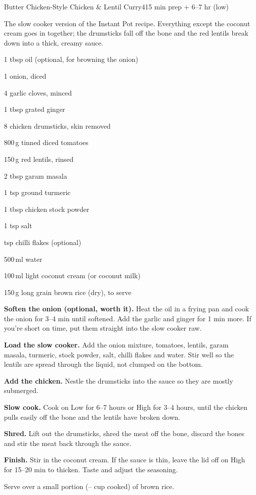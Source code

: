 \begin{recipebox}{Butter Chicken-Style Chicken \& Lentil Curry}{4}{15 min prep + 6--7 hr (low)}

The slow cooker version of the Instant Pot recipe. Everything except the
coconut cream goes in together; the drumsticks fall off the bone and the red
lentils break down into a thick, creamy sauce.

\begin{ingredients}
  \item 1 tbsp oil (optional, for browning the onion)
  \item 1 onion, diced
  \item 4 garlic cloves, minced
  \item 1 tbsp grated ginger
  \item 8 chicken drumsticks, skin removed
  \item 800\,g tinned diced tomatoes
  \item 150\,g red lentils, rinsed
  \item 2 tbsp garam masala
  \item 1 tsp ground turmeric
  \item 1 tbsp chicken stock powder
  \item 1 tsp salt
  \item {} tsp chilli flakes (optional)
  \item 500\,ml water
  \item 100\,ml light coconut cream (or coconut milk)
  \item 150\,g long grain brown rice (dry), to serve
\end{ingredients}

\begin{method}
  \item \textbf{Soften the onion (optional, worth it).} Heat the oil in a frying pan and cook the onion for 3--4 min until softened. Add the garlic and ginger for 1 min more. If you're short on time, put them straight into the slow cooker raw.
  \item \textbf{Load the slow cooker.} Add the onion mixture, tomatoes, lentils, garam masala, turmeric, stock powder, salt, chilli flakes and water. Stir well so the lentils are spread through the liquid, not clumped on the bottom.
  \item \textbf{Add the chicken.} Nestle the drumsticks into the sauce so they are mostly submerged.
  \item \textbf{Slow cook.} Cook on Low for 6--7 hours or High for 3--4 hours, until the chicken pulls easily off the bone and the lentils have broken down.
  \item \textbf{Shred.} Lift out the drumsticks, shred the meat off the bone, discard the bones and stir the meat back through the sauce.
  \item \textbf{Finish.} Stir in the coconut cream. If the sauce is thin, leave the lid off on High for 15--20 min to thicken. Taste and adjust the seasoning.
  \item Serve over a small portion (-- cup cooked) of brown rice.
\end{method}


\end{recipebox}
